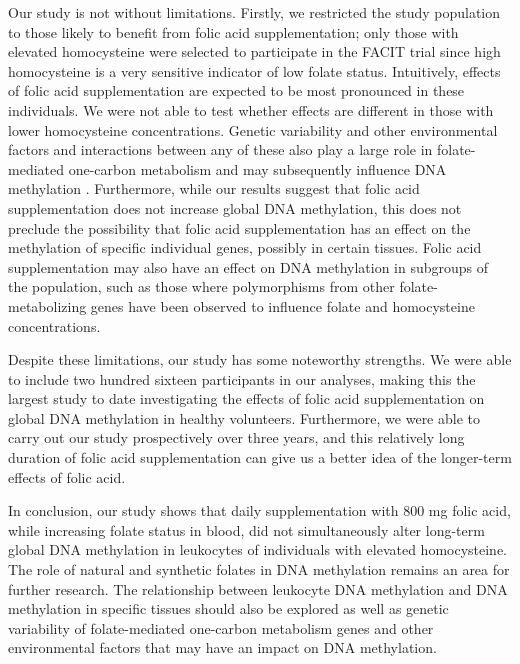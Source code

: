\noindent Our study is not without limitations. Firstly, we restricted the study population to those likely to benefit from folic acid supplementation; only those with elevated homocysteine were selected to participate in the FACIT trial since high homocysteine is a very sensitive indicator of low folate status. Intuitively, effects of folic acid supplementation are expected to be most pronounced in these individuals. We were not able to test whether effects are different in those with lower homocysteine concentrations. Genetic variability and other environmental factors and interactions between any of these also play a large role in folate-mediated one-carbon metabolism \cite{c444} and may subsequently influence DNA methylation \cite{c445}. Furthermore, while our results suggest that folic acid supplementation does not increase global DNA methylation, this does not preclude the possibility that folic acid supplementation has an effect on the methylation of specific individual genes, possibly in certain tissues. Folic acid supplementation may also have an effect on DNA methylation in subgroups of the population, such as those where polymorphisms from other folate-metabolizing genes have been observed to influence folate \cite{c446} and homocysteine \cite{c446,c447} concentrations.

\noindent Despite these limitations, our study has some noteworthy strengths. We were able to include two hundred sixteen participants in our analyses, making this the largest study to date investigating the effects of folic acid supplementation on global DNA methylation in healthy volunteers. Furthermore, we were able to carry out our study prospectively over three years, and this relatively long duration of folic acid supplementation can give us a better idea of the longer-term effects of folic acid.

\noindent In conclusion, our study shows that daily supplementation with 800 mg folic acid, while increasing folate status in blood, did not simultaneously alter long-term global DNA methylation in leukocytes of individuals with elevated homocysteine. The role of natural and synthetic folates in DNA methylation remains an area for further research. The relationship between leukocyte DNA methylation and DNA methylation in specific tissues should also be explored as well as genetic variability of folate-mediated one-carbon metabolism genes and other environmental factors that may have an impact on DNA methylation.
 
